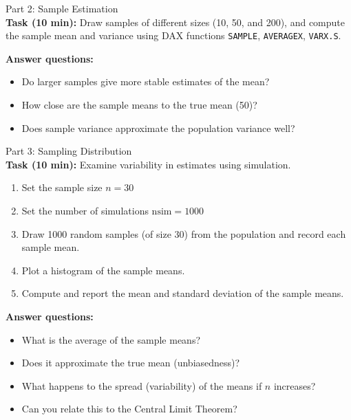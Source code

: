 \documentclass[main.tex]{subfiles}
\begin{document}
\begin{frame}
\begin{block}{Part 2: Sample Estimation\\}
\textbf{Task (10 min):} Draw samples of different sizes (10, 50, and 200), 
and compute the sample mean and variance using DAX functions \texttt{SAMPLE}, \texttt{AVERAGEX}, \texttt{VARX.S}.

\textbf{Answer questions:}
\begin{itemize}
  \item Do larger samples give more stable estimates of the mean?
  \item How close are the sample means to the true mean (50)?
  \item Does sample variance approximate the population variance well?
\end{itemize}
\end{block}
\end{frame}


\begin{frame}[fragile]
\begin{block}{Part 3: Sampling Distribution\\}
\textbf{Task (10 min):} Examine variability in estimates using simulation.
\begin{enumerate}\small
  \item Set the sample size $n=30$
  \item Set the number of simulations $\text{nsim} = 1000$
  \item Draw 1000 random samples (of size 30) from the population and record each sample mean.
  \item Plot a histogram of the sample means.
  \item Compute and report the mean and standard deviation of the sample means.
\end{enumerate}

\textbf{Answer questions:}
\begin{itemize}\small
  \item What is the average of the sample means?
  \item Does it approximate the true mean (unbiasedness)?
  \item What happens to the spread (variability) of the means if $n$ increases?
  \item Can you relate this to the Central Limit Theorem?
\end{itemize}
\end{block}
\end{frame}
\end{document}
